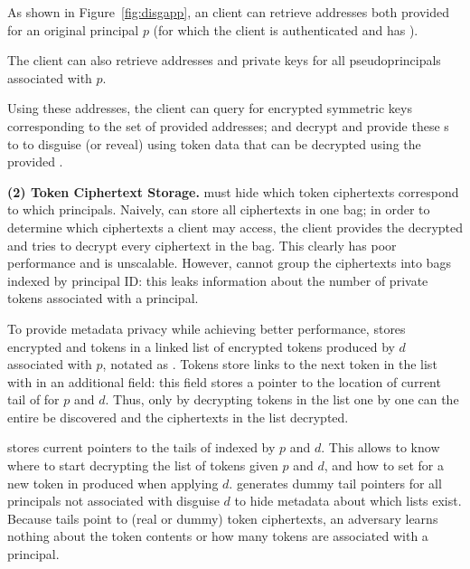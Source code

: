 As shown in Figure~\ref{fig:disgapp}, an \sys client can retrieve addresses both provided for an
original principal $p$ (for which the client is authenticated and has ). 

The client can also retrieve addresses and private keys for all pseudoprincipals associated with $p$.

Using these addresses, the client can query for encrypted symmetric \symk{} keys corresponding to
the set of provided addresses; and decrypt and provide these \symk{}s to \sys to disguise (or reveal) using token data that can be decrypted using the provided \symk{}.

\iffalse
\vspace{6pt}\noindent\textbf{(2) \tdata{} Token Ciphertext Storage.}
\sys must hide which token ciphertexts correspond to which principals.  Naively, \sys can store
all ciphertexts in one bag; in order to determine which ciphertexts a client may access, the client
provides the decrypted  and \sys tries to decrypt every ciphertext in the bag. This clearly
has poor performance and is unscalable.
However, \sys cannot group the ciphertexts into bags indexed by principal ID: this leaks information
about the number of private tokens associated with a principal.

To provide metadata privacy while achieving better performance, \sys stores encrypted  and
 tokens in a linked list of encrypted tokens produced by $d$ associated with $p$, notated
as . 
Tokens store links to the next token in the list with in an additional  field: this
field stores a pointer to the location of current tail of  for $p$ and $d$.
Thus, only by decrypting tokens in the list one by one can the entire  be discovered and
the ciphertexts in the list decrypted.

\sys stores current pointers to the tails of  indexed by $p$ and $d$. This allows \sys to
know where to start decrypting the list of tokens given $p$ and $d$, and how to set
 for a new token in  produced when applying $d$. \sys generates dummy
tail pointers for all principals not associated with disguise $d$ to hide metadata about which lists
exist.
Because  tails point to (real or dummy) token ciphertexts, an adversary learns nothing
about the token contents or how many tokens are associated with a principal.

